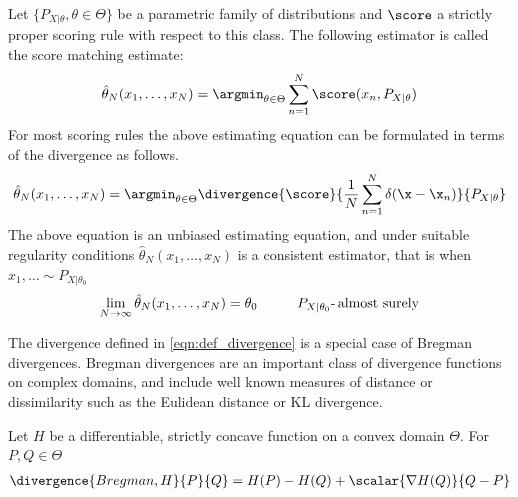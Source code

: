 \begin{definition}\label{def:score_matching}
Let $\{P_{X\vert\theta}, \theta\in\Theta\}$ be a parametric family of distributions and $\score$ a strictly proper scoring rule with respect to this class. The following estimator is called the score matching estimate:
\begin{equation}
	\hat{\theta}_N(x_1,\ldots,x_N) = \argmin_{\theta\in\Theta} \sum_{n=1}^{N}\score(x_n,P_{X\vert\theta}) \label{eqn:score_matching}
\end{equation}
For most scoring rules the above estimating equation can be formulated in terms of the divergence as follows.
\begin{equation}
	\hat{\theta}_N(x_1,\ldots,x_N) = \argmin_{\theta\in\Theta} \divergence{\score}{\frac{1}{N}\sum_{n=1}^{N}\delta(\x-\x_n)}{P_{X\vert\theta}}
\end{equation}
The above equation is an unbiased estimating equation, and under suitable regularity conditions $\hat{\theta}_N(x_1,\ldots,x_N)$ is a consistent estimator, that is when $x_1,\ldots\sim P_{X\vert\theta_0}$ \iid
\begin{equation}
	\lim_{N \rightarrow \infty} \hat{\theta}_N(x_1,\ldots,x_N) = \theta_0\hspace{1cm} P_{X\vert\theta_0}\mbox{-\,almost surely}
\end{equation}
\end{definition}


The divergence defined in \eqref{eqn:def_divergence} is a special case of Bregman divergences. Bregman divergences are an important class of divergence functions on complex domains, and include well known measures of distance or dissimilarity such as the Eulidean distance or KL divergence.

\begin{definition}
	Let $H$ be a differentiable, strictly concave function on a convex domain $\Theta$. For $P,Q\in\Theta$ 
	\begin{align}
		\divergence{Bregman,H}{P}{Q} = H(P) - H(Q) + \scalar{\nabla H(Q)}{Q-P}
	\end{align}
\end{definition}

